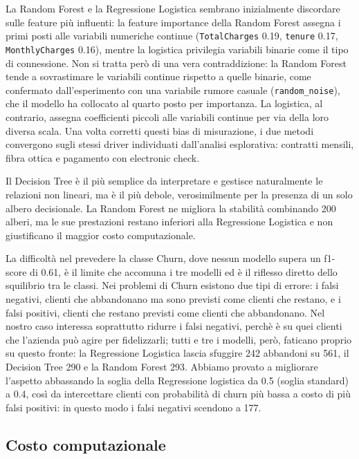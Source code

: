 \documentclass[11pt]{article}
\begin{document}
La Random Forest e la Regressione Logistica sembrano inizialmente discordare sulle feature più influenti: la feature importance della Random Forest assegna i primi posti alle variabili numeriche continue (\texttt{TotalCharges} 0.19, \texttt{tenure} 0.17, \texttt{MonthlyCharges} 0.16), mentre la logistica privilegia variabili binarie come il tipo di connessione. Non si tratta però di una vera contraddizione: la Random Forest tende a sovrastimare le variabili continue rispetto a quelle binarie, come confermato dall'esperimento con una variabile rumore casuale (\texttt{random\_noise}), che il modello ha collocato al quarto posto per importanza. La logistica, al contrario, assegna coefficienti piccoli alle variabili continue per via della loro diversa scala. Una volta corretti questi bias di misurazione, i due metodi convergono sugli stessi driver individuati dall'analisi esplorativa: contratti mensili, fibra ottica e pagamento con electronic check.

Il Decision Tree è il più semplice da interpretare e gestisce naturalmente le relazioni non lineari, ma è il più debole, verosimilmente per la presenza di un solo albero decisionale. La Random Forest ne migliora la stabilità combinando 200 alberi, ma le sue prestazioni restano inferiori alla Regressione Logistica e non giustificano il maggior costo computazionale.

\indent La difficoltà nel prevedere la classe Churn, dove nessun modello supera un
f1-score di 0.61, è il limite che accomuna i tre modelli ed è il riflesso diretto dello
squilibrio tra le classi. Nei problemi di Churn esistono due tipi di errore: i falsi
negativi, clienti che abbandonano ma sono previsti come clienti che restano, e i falsi positivi, clienti che restano previsti come clienti che abbandonano. Nel nostro caso interessa soprattutto ridurre i falsi negativi, perchè è su quei clienti che l’azienda può agire per fidelizzarli; tutti e tre i modelli, però, faticano proprio su questo fronte: la Regressione Logistica lascia sfuggire 242 abbandoni su 561, il Decision Tree 290 e la Random Forest 293. Abbiamo provato a migliorare l’aspetto abbassando la soglia della Regressione logistica da 0.5 (soglia standard) a 0.4, così da intercettare clienti con probabilità di churn più bassa a costo di più falsi positivi: in questo modo i falsi negativi scendono a 177.

\subsection{Costo computazionale}
\end{document}
